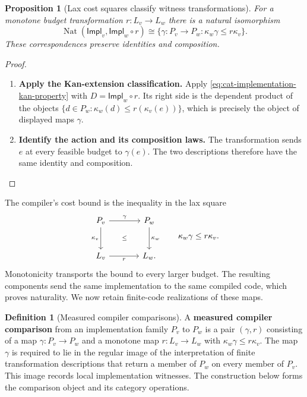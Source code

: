 \documentclass[11pt,a4paper]{article}
\numberwithin{algorithm}{section}
\numberwithin{equation}{section}
\newtheorem{proposition}[proposition]{Proposition}
\theoremstyle{definition}
\newtheorem{definition}[definition]{Definition}
\theoremstyle{remark}
\theoremstyle{plain}
\theoremstyle{definition}
\theoremstyle{plain}
\begin{document}
\begin{proposition}[Lax cost squares classify witness transformations]
\label{prop:cat-lax-compiler}
For a monotone budget transformation $r:L_v\to L_w$ there is a
natural isomorphism
\begin{equation}\label{eq:cat-lax-compiler}
 \operatorname{Nat}(\mathsf{Impl}_v,\mathsf{Impl}_w\circ r)
 \cong
 \{\gamma:P_v\to P_w:\kappa_w\gamma\le r\kappa_v\}.
\end{equation}
These correspondences preserve identities and composition.
\end{proposition}
\begin{proof}\leavevmode
\begin{enumerate}[leftmargin=*,align=left]
\item \textbf{Apply the Kan-extension classification.}
Apply \cref{eq:cat-implementation-kan-property} with
$D=\mathsf{Impl}_w\circ r$.  Its right side is the dependent
product of the objects
$\{d\in P_w:\kappa_w(d)\le r(\kappa_v(e))\}$, which is precisely
the object of displayed maps $\gamma$.

\item \textbf{Identify the action and its composition laws.}
The transformation sends
$e$ at every feasible budget to $\gamma(e)$.
The two descriptions therefore have the same identity and composition.
\end{enumerate}
\end{proof}
The compiler's cost bound is the inequality in the lax square
\begin{equation}\label{eq:cat-lax-cost-square}
\begin{tikzcd}[column sep=large,row sep=large]
 P_v \arrow[r,"{\gamma}"] \arrow[d,"{\kappa_v}"']
   \arrow[dr,phantom,"{\scriptstyle\le}" description]
   & P_w \arrow[d,"{\kappa_w}"]\\
 L_v \arrow[r,"{r}"'] & L_w .
\end{tikzcd}
\qquad \kappa_w\gamma\le r\kappa_v.
\end{equation}
Monotonicity transports the bound to every larger budget. The resulting
components send the same implementation to the same compiled code, which
proves naturality. We now retain finite-code realizations of these maps.

\begin{definition}[Measured compiler comparisons]\label{def:measured-compiler-comparisons}
A \textbf{measured compiler comparison} from an implementation
family $P_v$ to $P_w$ is a pair $(\gamma,r)$ consisting of a map
$\gamma:P_v\to P_w$ and a monotone map $r:L_v\to L_w$ with
$\kappa_w\gamma\le r\kappa_v$. The map $\gamma$ is required to lie
in the regular image of the interpretation of finite transformation
descriptions that return a member of $P_w$ on every member of $P_v$.
This image records local implementation witnesses. The construction
below forms the comparison object and its category operations.
\end{definition}
\end{document}

